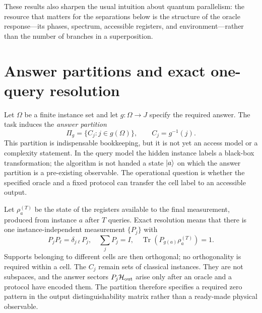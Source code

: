 \documentclass[
  aps,
  pra,
  reprint,
  nofootinbib
]{revtex4-2}
\begin{document}
These results also sharpen the usual intuition about quantum parallelism: the
resource that matters for the separations below is the structure of the oracle
response---its phases, spectrum, accessible registers, and
environment---rather than the number of branches in a superposition.

\section{Answer partitions and exact one-query resolution}
\label{sec:criterion}

Let \(\Omega\) be a finite instance set and let \(g:\Omega\rightarrow J\)
specify the required answer. The task induces the \emph{answer partition}
\begin{equation}
 \Pi_g=\{C_j:j\in g(\Omega)\},\qquad C_j=g^{-1}(j).
 \label{eq:task-partition}
\end{equation}
This partition is indispensable bookkeeping, but it is not yet an access model
or a complexity statement. In the query model the hidden instance labels a
black-box transformation; the algorithm is not handed a state \(\ket a\) on
which the answer partition is a pre-existing observable. The operational
question is whether the specified oracle and a fixed protocol can transfer the
cell label to an accessible output.

Let \(\rho_a^{(T)}\) be the state of the registers available to the final
measurement, produced from instance \(a\) after \(T\) queries. Exact resolution
means that there is one instance-independent measurement \(\{P_j\}\) with
\begin{equation}
 P_jP_\ell=\delta_{j\ell}P_j,\quad
 \sum_jP_j=I,\quad
 \operatorname{Tr}(P_{g(a)}\rho_a^{(T)})=1.
 \label{eq:output-sectors}
\end{equation}
Supports belonging to different cells are then orthogonal; no orthogonality is
required within a cell. The \(C_j\) remain sets of classical instances. They
are not subspaces, and the answer sectors \(P_j\mathcal H_{\rm out}\) arise
only after an oracle and a protocol have encoded them. The partition therefore
specifies a required zero pattern in the output distinguishability matrix
rather than a ready-made physical observable.
\end{document}
